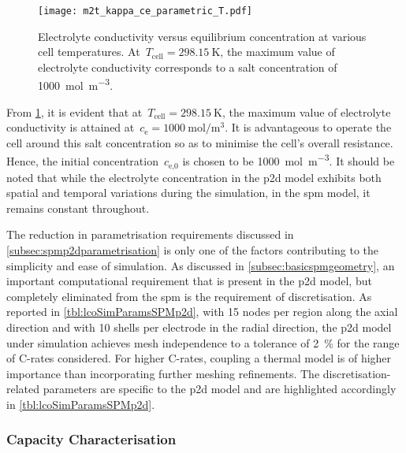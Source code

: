\begin{figure}[!htbp]
    \centering
    \texttt{[image: m2t\_kappa\_ce\_parametric\_T.pdf]}
    \caption[Electrolyte conductivity versus concentration at various cell
    temperatures]{Electrolyte conductivity versus equilibrium concentration at
        various cell temperatures. At~${T_\text{cell} = \SI{298.15}{\kelvin}}$,
        the maximum value of electrolyte conductivity corresponds to a salt
    concentration of \SI{1000}{\mol\per\meter\cubed}.}
    \label{fig:kappavsce}
\end{figure}

From        \cref{fig:kappavsce},        it        is        evident        that
at~${T_\text{cell}=\SI{298.15}{\kelvin}}$,  the  maximum  value  of  electrolyte
conductivity is  attained at~${c_\text{e}  = \SI{1000}{\mole\per\meter\cubed}}$.
It is advantageous to  operate the cell around this salt  concentration so as to
minimise  the  cell's  overall  resistance.  Hence,  the  initial  concentration~$c_\text{e,0}$ is  chosen to  be \SI{1000}{\mole\per\meter\cubed}. It  should be
noted that while  the electrolyte concentration in the  \gls{p2d} model exhibits
both spatial  and temporal  variations during the  simulation, in  the \gls{spm}
model, it remains constant throughout.

The     reduction    in     parametrisation     requirements    discussed     in
\cref{subsec:spmp2dparametrisation}    is    only    one    of    the    factors
contributing  to  the  simplicity  and  ease  of  simulation.  As  discussed  in
\cref{subsec:basicspmgeometry}, an  important computational requirement  that is
present in the \gls{p2d} model, but  completely eliminated from the \gls{spm} is
the requirement of discretisation. As reported in \cref{tbl:lcoSimParamsSPMp2d},
with  15 nodes  per region  along the  axial direction  and with  10 shells  per
electrode in the radial direction, the \gls{p2d} model under simulation achieves
mesh  independence  to a  tolerance  of  \approx\SI{2}{\percent} for  the  range
of  C-rates  considered.  For  higher  C-rates,  coupling  a  thermal  model  is
of  higher  importance  than  incorporating  further  meshing  refinements.  The
discretisation-related parameters  are specific to  the \gls{p2d} model  and are
highlighted accordingly in \cref{tbl:lcoSimParamsSPMp2d}.

\subsubsection*{Capacity Characterisation}\label{subsubsec:capcharspmp2d}

